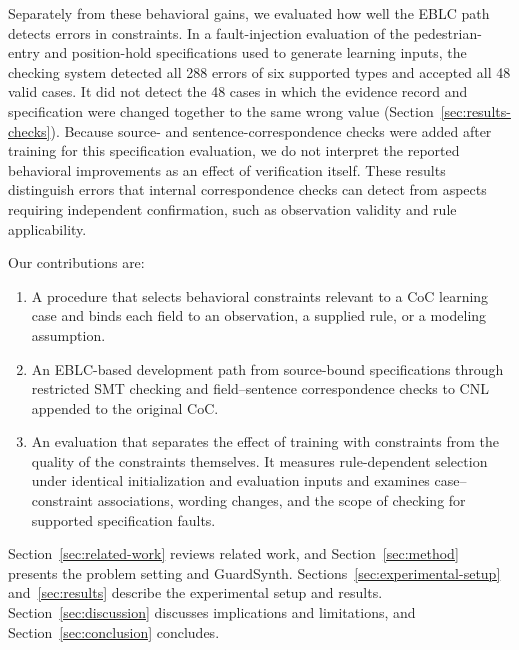 Separately from these behavioral gains, we evaluated how well the EBLC path detects errors in constraints. In a fault-injection evaluation of the pedestrian-entry and position-hold specifications used to generate learning inputs, the checking system detected all 288 errors of six supported types and accepted all 48 valid cases. It did not detect the 48 cases in which the evidence record and specification were changed together to the same wrong value (Section~\ref{sec:results-checks}). Because source- and sentence-correspondence checks were added after training for this specification evaluation, we do not interpret the reported behavioral improvements as an effect of verification itself. These results distinguish errors that internal correspondence checks can detect from aspects requiring independent confirmation, such as observation validity and rule applicability.\par

Our contributions are:\par

\begin{enumerate}
\item A procedure that selects behavioral constraints relevant to a CoC learning case and binds each field to an observation, a supplied rule, or a modeling assumption.
\item An EBLC-based development path from source-bound specifications through restricted SMT checking and field--sentence correspondence checks to CNL appended to the original CoC.
\item An evaluation that separates the effect of training with constraints from the quality of the constraints themselves. It measures rule-dependent selection under identical initialization and evaluation inputs and examines case--constraint associations, wording changes, and the scope of checking for supported specification faults.
\end{enumerate}

Section~\ref{sec:related-work} reviews related work, and Section~\ref{sec:method} presents the problem setting and GuardSynth. Sections~\ref{sec:experimental-setup} and~\ref{sec:results} describe the experimental setup and results. Section~\ref{sec:discussion} discusses implications and limitations, and Section~\ref{sec:conclusion} concludes.
